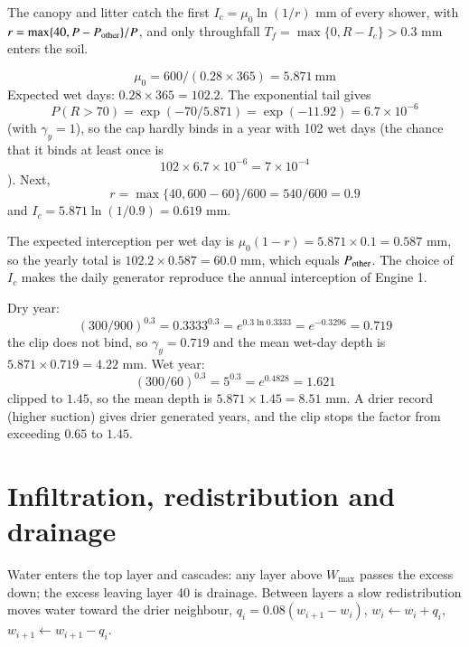 The canopy and litter catch the first $I_c=\mu_0\ln(1/r)$ mm of every shower, with $r=\max\{40,P-P_{\rm other}\}/P$, and only throughfall $T_f=\max\{0,R-I_c\}>0.3$ mm enters the soil.

\sol {}\ans \[\mu_0=600/(0.28\times365)=5.871\ \text{mm}\]
Expected wet days: $0.28\times365=102.2$. The exponential tail gives \[P(R>70)=\exp(-70/5.871)=\exp(-11.92)=6.7\times10^{-6}\] (with $\gamma_y=1$), so the cap hardly binds in a year with 102 wet days (the chance that it binds at least once is \[102\times6.7\times10^{-6}=7\times10^{-4}\]). Next, \[r=\max\{40,600-60\}/600=540/600=0.9\] and $I_c=5.871\ln(1/0.9)=0.619$ mm. \finans

 The expected interception per wet day is $\mu_0(1-r)=5.871\times0.1=0.587$ mm, so the yearly total is $102.2\times0.587=60.0$ mm, which equals $P_{\rm other}$. The choice of $I_c$ makes the daily generator reproduce the annual interception of Engine 1.


\sol {}\ans Dry year: \[(300/900)^{0.3}=0.3333^{0.3}=e^{0.3\ln0.3333}=e^{-0.3296}=0.719\]
the clip does not bind, so $\gamma_y=0.719$ and the mean wet-day depth is $5.871\times0.719=4.22$ mm. Wet year: \[(300/60)^{0.3}=5^{0.3}=e^{0.4828}=1.621\]
clipped to $1.45$, so the mean depth is $5.871\times1.45=8.51$ mm. A drier record (higher suction) gives drier generated years, and the clip stops the factor from exceeding $0.65$ to $1.45$. \finans


\section{Infiltration, redistribution and drainage}
Water enters the top layer and cascades: any layer above $W_{\max}$ passes the excess down; the excess leaving layer 40 is drainage. Between layers a slow redistribution moves water toward the drier neighbour, $q_i=0.08(w_{i+1}-w_i)$, $w_i\leftarrow w_i+q_i$, $w_{i+1}\leftarrow w_{i+1}-q_i$.

